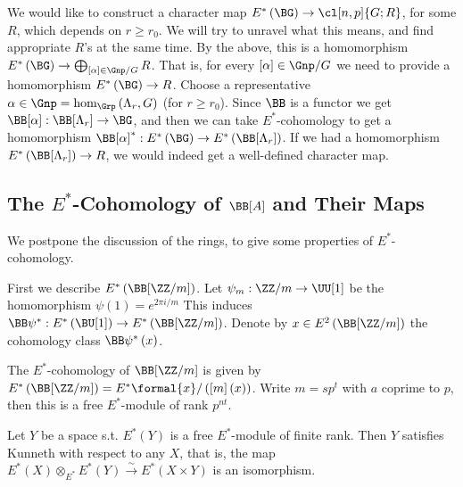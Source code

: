 We would like to construct a character map $E^*\left(\BG\right) \to \cl[n,p]{G; R}$, for some $R$, which depends on $r \geq r_0$.
We will try to unravel what this means, and find appropriate $R$'s at the same time.
By the above, this is a homomorphism $E^*\left(\BG\right) \to \bigoplus_{\left[\alpha\right] \in \Gnp/G} R$.
That is, for every $\left[\alpha\right] \in \Gnp/G$ we need to provide a homomorphism $E^*\left(\BG\right) \to R$.
Choose a representative $\alpha \in \Gnp = \hom_{\Grp}\left(\Lambda_r, G\right)$ (for $r \geq r_0$).
Since $\BB$ is a functor we get $\BB[\alpha]: \BB[\Lambda_r] \to \BG$, and then we can take $E^*$-cohomology to get a homomorphism $\BB[\alpha]^*: E^*\left(\BG\right) \to E^*\left(\BB[\Lambda_r]\right)$.
If we had a homomorphism $E^*\left(\BB[\Lambda_r]\right) \to R$, we would indeed get a well-defined character map.



\subsection{The \texorpdfstring{$E^*$}{E*}-Cohomology of \texorpdfstring{$\BB[A]$}{BA} and Their Maps}

We postpone the discussion of the rings, to give some properties of $E^*$-cohomology.

First we describe $E^*\left(\BB[\ZZ/m]\right)$.
Let $\psi_m: \ZZ/m \to \UU[1]$ be the homomorphism $\psi\left(1\right) = e^{2\pi i/m}$
This induces $\BB\psi^*: E^*\left(\BU[1]\right) \to E^*\left(\BB[\ZZ/m]\right)$.
Denote by $x \in E^2\left(\BB[\ZZ/m]\right)$ the cohomology class $\BB\psi^*\left(x\right)$.

\begin{proposition}
	The $E^*$-cohomology of $\BB[\ZZ/m]$ is given by $E^*\left(\BB[\ZZ/m]\right) = E^*\formal{x} / \left(\left[m\right]\left(x\right)\right)$.
	Write $m = sp^t$ with $a$ coprime to $p$, then this is a free $E^*$-module of rank $p^{nt}$.
\end{proposition}

\begin{proposition}
	Let $Y$ be a space s.t. $E^*\left(Y\right)$ is a free $E^*$-module of finite rank.
	Then $Y$ satisfies Kunneth with respect to any $X$, that is, the map $E^*\left(X\right) \otimes_{E^*} E^*\left(Y\right) \xrightarrow{\sim} E^*\left(X \times Y\right)$ is an isomorphism.
\end{proposition}

